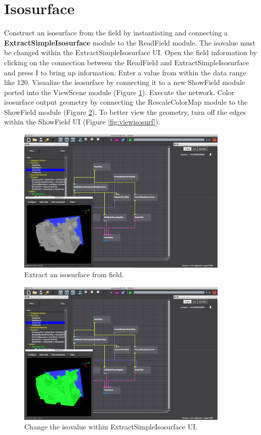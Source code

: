 \documentclass[fleqn,11pt,openany]{book}
\begin{document}
\section{Isosurface}\label{isosurface}

Construct an isosurface from the field by instantiating and connecting a \textbf{ExtractSimpleIsosurface} module to the ReadField module. The isovalue must be changed within the ExtractSimpleIsosurface UI. Open the field information by clicking on the connection between the ReadField and ExtractSimpleIsosurface  and press I to bring up information. Enter a value from within the data range like 120. 
Visualize the isosurface by connecting it to a new ShowField module ported into the ViewScene module (Figure \ref{fig:extract}). 
Execute the network. Color isosurface output geometry by connecting the RescaleColorMap module to the ShowField module (Figure \ref{fig:changeisoval}). To better view the geometry, turn off the edges within the ShowField UI (Figure \ref{fig:viewisosurf}). 

\begin{figure}[H]
\center
\includegraphics[width=0.9\textwidth]{BasicTutorial_figures/extractiso.png}
\caption{Extract an isosurface from field.}
\label{fig:extract}
\end{figure}

\begin{figure}[H]
\center
\includegraphics[width=0.9\textwidth]{BasicTutorial_figures/coloriso.png}
\caption{Change the isovalue within ExtractSimpleIsosurface UI.}
\label{fig:changeisoval}
\end{figure}
\end{document}
